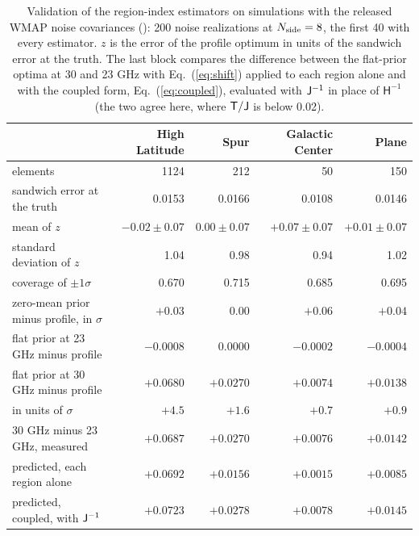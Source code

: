 \begin{table}
\centering
\caption{Validation of the region-index estimators on simulations with the released WMAP noise
covariances (): 200 noise realizations at $N_{\rm side}=8$, the first 40 with every
estimator. $z$ is the error of the profile optimum in units of the sandwich error at the truth.
The last block compares the difference between the flat-prior optima at 30 and 23 GHz with
Eq.~(\ref{eq:shift}) applied to each region alone and with the coupled form,
Eq.~(\ref{eq:coupled}), evaluated with $\mathsf{J}^{-1}$ in place of $\mathsf{H}^{-1}$ (the two agree here, where
$\mathsf{T}/\mathsf{J}$ is below 0.02).}
\label{tab:e039}
\small
\begin{tabular}{lrrrr}
\toprule
 & High Latitude & Spur & Galactic Center & Plane \\
\midrule
elements & 1124 & 212 & 50 & 150 \\
sandwich error at the truth & 0.0153 & 0.0166 & 0.0108 & 0.0146 \\
mean of $z$ & $-0.02 \pm 0.07$ & $0.00 \pm 0.07$ & $+0.07 \pm 0.07$ & $+0.01 \pm 0.07$ \\
standard deviation of $z$ & 1.04 & 0.98 & 0.94 & 1.02 \\
coverage of $\pm1\sigma$ & 0.670 & 0.715 & 0.685 & 0.695 \\
zero-mean prior minus profile, in $\sigma$ & $+0.03$ & $0.00$ & $+0.06$ & $+0.04$ \\
\midrule
flat prior at 23 GHz minus profile & $-0.0008$ & $0.0000$ & $-0.0002$ & $-0.0004$ \\
flat prior at 30 GHz minus profile & $+0.0680$ & $+0.0270$ & $+0.0074$ & $+0.0138$ \\
\quad in units of $\sigma$ & $+4.5$ & $+1.6$ & $+0.7$ & $+0.9$ \\
30 GHz minus 23 GHz, measured & $+0.0687$ & $+0.0270$ & $+0.0076$ & $+0.0142$ \\
\quad predicted, each region alone & $+0.0692$ & $+0.0156$ & $+0.0015$ & $+0.0085$ \\
\quad predicted, coupled, with $\mathsf{J}^{-1}$ & $+0.0723$ & $+0.0278$ & $+0.0078$ & $+0.0145$ \\
\bottomrule
\end{tabular}
\end{table}


